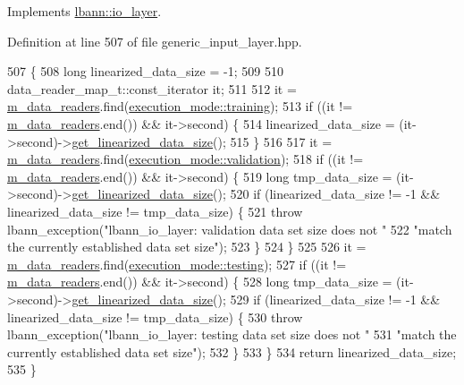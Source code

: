 Implements \hyperlink{classlbann_1_1io__layer_ab061ec74d131699c7fd59b992bbe7036}{lbann\+::io\+\_\+layer}.



Definition at line 507 of file generic\+\_\+input\+\_\+layer.\+hpp.


\begin{DoxyCode}
507                                                  \{
508     \textcolor{keywordtype}{long} linearized\_data\_size = -1;
509 
510     data\_reader\_map\_t::const\_iterator it;
511 
512     it = \hyperlink{classlbann_1_1generic__input__layer_a6bc18860c02beed0252ea3cc87bc48d2}{m\_data\_readers}.find(\hyperlink{base_8hpp_a2781a159088df64ed7d47cc91c4dc0a8ac185ddac8b5a8f5aa23c5b80bc12d214}{execution\_mode::training});
513     \textcolor{keywordflow}{if} ((it != \hyperlink{classlbann_1_1generic__input__layer_a6bc18860c02beed0252ea3cc87bc48d2}{m\_data\_readers}.end()) && it->second) \{
514       linearized\_data\_size = (it->second)->\hyperlink{classlbann_1_1generic__input__layer_aca46cbf29ad2762e9329b46ab2ad1ae7}{get\_linearized\_data\_size}();
515     \}
516 
517     it = \hyperlink{classlbann_1_1generic__input__layer_a6bc18860c02beed0252ea3cc87bc48d2}{m\_data\_readers}.find(\hyperlink{base_8hpp_a2781a159088df64ed7d47cc91c4dc0a8aa617908b172c473cb8e8cda059e55bf0}{execution\_mode::validation});
518     \textcolor{keywordflow}{if} ((it != \hyperlink{classlbann_1_1generic__input__layer_a6bc18860c02beed0252ea3cc87bc48d2}{m\_data\_readers}.end()) && it->second) \{
519       \textcolor{keywordtype}{long} tmp\_data\_size = (it->second)->\hyperlink{classlbann_1_1generic__input__layer_aca46cbf29ad2762e9329b46ab2ad1ae7}{get\_linearized\_data\_size}();
520       \textcolor{keywordflow}{if} (linearized\_data\_size != -1 && linearized\_data\_size != tmp\_data\_size) \{
521         \textcolor{keywordflow}{throw} lbann\_exception(\textcolor{stringliteral}{"lbann\_io\_layer: validation data set size does not "}
522                               \textcolor{stringliteral}{"match the currently established data set size"});
523       \}
524     \}
525 
526     it = \hyperlink{classlbann_1_1generic__input__layer_a6bc18860c02beed0252ea3cc87bc48d2}{m\_data\_readers}.find(\hyperlink{base_8hpp_a2781a159088df64ed7d47cc91c4dc0a8aae2b1fca515949e5d54fb22b8ed95575}{execution\_mode::testing});
527     \textcolor{keywordflow}{if} ((it != \hyperlink{classlbann_1_1generic__input__layer_a6bc18860c02beed0252ea3cc87bc48d2}{m\_data\_readers}.end()) && it->second) \{
528       \textcolor{keywordtype}{long} tmp\_data\_size = (it->second)->\hyperlink{classlbann_1_1generic__input__layer_aca46cbf29ad2762e9329b46ab2ad1ae7}{get\_linearized\_data\_size}();
529       \textcolor{keywordflow}{if} (linearized\_data\_size != -1 && linearized\_data\_size != tmp\_data\_size) \{
530         \textcolor{keywordflow}{throw} lbann\_exception(\textcolor{stringliteral}{"lbann\_io\_layer: testing data set size does not "}
531                               \textcolor{stringliteral}{"match the currently established data set size"});
532       \}
533     \}
534     \textcolor{keywordflow}{return} linearized\_data\_size;
535   \}
\end{DoxyCode}
